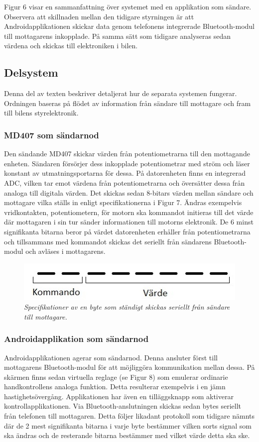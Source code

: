 \documentclass[a4paper]{article}
\begin{document}
Figur 6 visar en sammanfattning över systemet med en applikation som sändare. Observera att skillnaden mellan den tidigare styrningen är att Androidapplikationen skickar data genom telefonens integrerade Bluetooth-modul till mottagarens inkopplade. På samma sätt som tidigare analyseras sedan värdena och skickas till elektroniken i bilen.


\subsection{Delsystem}
Denna del av texten beskriver detaljerat hur de separata systemen fungerar. Ordningen baseras på flödet av information från sändare till mottagare och fram till bilens styrelektronik.




\subsubsection{MD407 som sändarnod}
Den sändande MD407 skickar värden från potentiometrarna till den mottagande enheten. Sändaren försörjer dess inkopplade potentiometrar med ström och läser konstant av utmatningsportarna för dessa. På datorenheten finns en integrerad ADC, vilken tar emot värdena från potentiometrarna och översätter dessa från analoga till digitala värden. Det skickas sedan 8-bitars värden mellan sändare och mottagare vilka ställs in enligt specifikationerna i Figur 7. Ändras exempelvis vridkontakten, potentiometern, för motorn ska kommandot initieras till det värde där mottagaren i sin tur sänder informationen till motorns elektronik. De 6 minst signifikanta bitarna beror på värdet datorenheten erhåller från potentiometrarna och tillsammans med kommandot skickas det seriellt från sändarens Bluetooth-modul och avläses i mottagarens.


\begin{figure}[H]
\includegraphics[scale=1]{aByteComVal.jpg}
\centering
\caption{\it Specifikationer av en byte som ständigt skickas seriellt från sändare till mottagare.}
\end{figure}


\subsubsection{Androidapplikation som sändarnod}
Androidapplikationen agerar som sändarnod. Denna ansluter först till mottagarens Bluetooth-modul för att möjliggöra kommunikation mellan dessa. På skärmen finns sedan virtuella reglage (se Figur 8) som emulerar ordinarie handkontrollens analoga funktion. Detta resulterar exempelvis i en jämn hastighetsövergång. Applikationen har även en tilläggsknapp som aktiverar kontrollapplikationen. Via Bluetooth-anslutningen skickas sedan bytes seriellt från telefonen till mottagaren. Detta följer likadant protokoll som tidigare nämnts där de 2 mest signifikanta bitarna i varje byte bestämmer vilken sorts signal som ska ändras och de resterande bitarna bestämmer med vilket värde detta ska ske.
\end{document}
